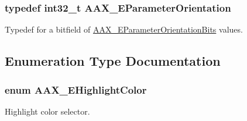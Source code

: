 \subsubsection[{A\+A\+X\+\_\+\+E\+Parameter\+Orientation}]{\setlength{\rightskip}{0pt plus 5cm}typedef int32\+\_\+t {\bf A\+A\+X\+\_\+\+E\+Parameter\+Orientation}}\label{a00206_a52f91d1c14aa5dceedabfb9d2de31bf0}


Typedef for a bitfield of \hyperlink{a00206_aa5ffa1ed828630b6b7a13c049d93ae87}{A\+A\+X\+\_\+\+E\+Parameter\+Orientation\+Bits} values. 



\subsection{Enumeration Type Documentation}
\hypertarget{a00206_a143056a07989a48e5db3a101f1b12567}{}
\subsubsection[{A\+A\+X\+\_\+\+E\+Highlight\+Color}]{\setlength{\rightskip}{0pt plus 5cm}enum {\bf A\+A\+X\+\_\+\+E\+Highlight\+Color}}\label{a00206_a143056a07989a48e5db3a101f1b12567}


Highlight color selector. 

